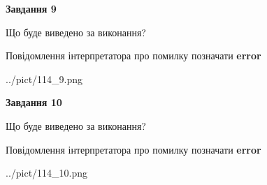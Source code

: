 \documentclass[12pt, ukrainian]{article}
\begin{document}
{{\begin {center}\textbf{Завдання 9}\end {center}}\par
Що буде виведено за виконання? \par
Повідомлення інтерпретатора про помилку позначати \textbf{error}

\begin{center}
	{../pict/114_9.png}
\end{center}
\newpage

{\begin {center}\textbf{Завдання 10}\end {center}}\par
Що буде виведено за виконання? \par
Повідомлення інтерпретатора про помилку позначати \textbf{error}

\begin{center}
	{../pict/114_10.png}
\end{center}
\newpage

}
\end{document}
